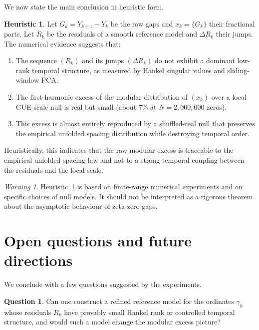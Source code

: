 \documentclass[11pt]{amsart}
\numberwithin{equation}{section}
\theoremstyle{plain}
\theoremstyle{definition}
\newtheorem{heuristic}[theorem]{Heuristic}
\newtheorem{question}[theorem]{Question}
\theoremstyle{remark}
\newtheorem{warning}[theorem]{Warning}
\begin{document}
We now state the main conclusion in heuristic form.

\begin{heuristic}
\label{heur:main_conclusion}
Let $G_k = Y_{k+1} - Y_k$ be the raw gaps and
$x_k = \{G_k\}$ their fractional parts.
Let $R_k$ be the residuals of a smooth reference model and
$\Delta R_k$ their jumps.
The numerical evidence suggests that:
\begin{enumerate}[label=\textup{(\alph*)},leftmargin=*]
\item The sequence $(R_k)$ and its jumps $(\Delta R_k)$
do not exhibit a dominant low-rank temporal structure,
as measured by Hankel singular values and sliding-window PCA.
\item The first-harmonic excess of the modular distribution of
$(x_k)$ over a local GUE-scale null is real but small
(about $7\%$ at $N=2{,}000{,}000$ zeros).
\item This excess is almost entirely reproduced by a shuffled-real
null that preserves the empirical unfolded spacing distribution
while destroying temporal order.
\end{enumerate}
Heuristically, this indicates that the raw modular excess is
traceable to the empirical unfolded spacing law and not to
a strong temporal coupling between the residuals and the local scale.
\end{heuristic}

\begin{warning}
\label{warn:nonrigorous_status}
Heuristic~\ref{heur:main_conclusion} is based on finite-range
numerical experiments and on specific choices of null models.
It should not be interpreted as a rigorous theorem about the
asymptotic behaviour of zeta-zero gaps.
\end{warning}

\section{Open questions and future directions}
\label{sec:open_questions}

We conclude with a few questions suggested by the experiments.

\begin{question}
\label{q:residual_model_refinement}
Can one construct a refined reference model for the ordinates
$\gamma_k$ whose residuals $R_k$ have provably small Hankel rank
or controlled temporal structure, and would such a model
change the modular excess picture?
\end{question}
\end{document}
